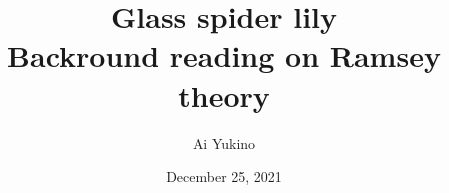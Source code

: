\documentclass{article}
\theoremstyle{definition} %
\theoremstyle{plain} %
\theoremstyle{remark} %
\numberwithin{equation}{section}
\begin{document}
\title{Glass spider lily\\
	\large Backround reading on Ramsey theory}
\author{Ai Yukino}
\date{December 25, 2021}
\maketitle
\hypersetup{linkcolor = internallinkcolor}
\tableofcontents
\hypersetup{linkcolor= .}
\end{document}
